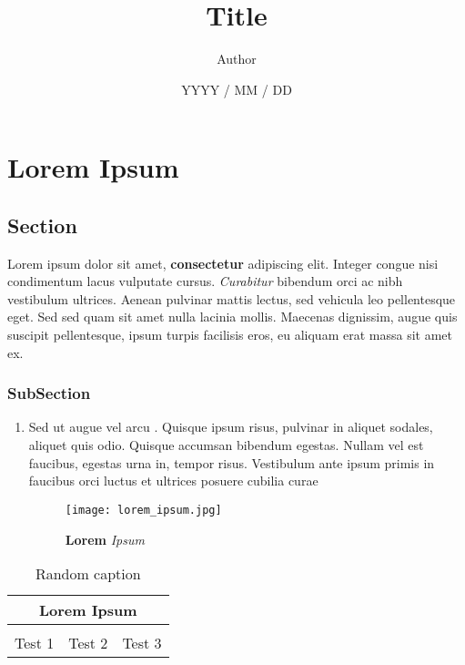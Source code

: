 \documentclass[12pt]{report}
\title{Title}
\author{Author}
\date{YYYY / MM / DD}
\begin{document}
	\maketitle
	\tableofcontents
	\chapter{Lorem Ipsum} \label{chap_1}

		\section{Section} \label{sec_1}

			Lorem ipsum dolor sit amet, \textbf{consectetur} adipiscing elit. Integer congue nisi condimentum lacus vulputate cursus. \textit{Curabitur} bibendum orci ac nibh vestibulum ultrices. Aenean pulvinar mattis lectus, sed vehicula leo pellentesque eget. Sed sed quam sit amet nulla lacinia mollis. Maecenas dignissim, augue quis suscipit pellentesque, ipsum turpis facilisis eros, eu aliquam erat massa sit amet ex.

			\subsection*{SubSection} \label{subsec_1}

				\begin{enumerate} \label{enum_1}

					\item
					Sed ut augue vel arcu {\color{blue}{varius accumsan}}. Quisque ipsum risus, pulvinar in aliquet sodales, aliquet quis odio. Quisque accumsan bibendum egestas. Nullam vel est faucibus, egestas urna in, tempor risus. Vestibulum ante ipsum primis in faucibus orci luctus et ultrices posuere cubilia curae

					\begin{figure}[H] \label{fig_1}
						\centering
						\texttt{[image: lorem\_ipsum.jpg]}
						\caption{\textbf{Lorem} \textit{Ipsum}}
					\end{figure}

				\end{enumerate}

			\begin{table}[H] \label{tab_1}
				\centering
				\begin{tabular}{|c|c|c|}
					\hline
					\multicolumn{3}{|c|}{\textbf{Lorem Ipsum}} \\
					\hline
					{\color{red}{First}} & {\color{violet}{Second}} & {\color{teal}{Third}} \\
					\hline
					Test 1 & Test 2 & Test 3 \\
					\hline
				\end{tabular}
				\caption{Random caption}
			\end{table}
\end{document}
